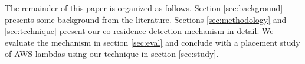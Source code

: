 



The remainder of this paper is organized as follows. Section
\ref{sec:background} presents some background from the literature. Sections
\ref{sec:methodology} and \ref{sec:technique} present our co-residence detection
mechanism in detail. We evaluate the mechanism in section \ref{sec:eval} and
conclude with a placement study of AWS lambdas using our technique in section
\ref{sec:study}.  

